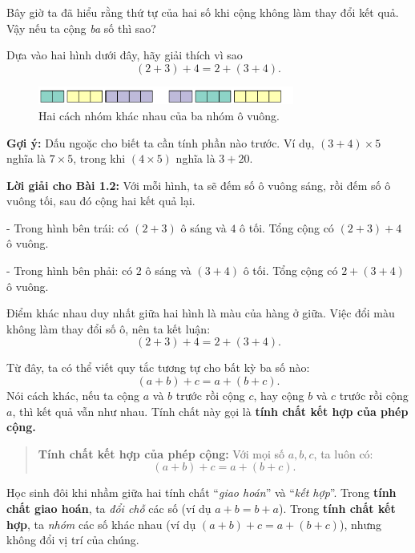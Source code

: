 Bây giờ ta đã hiểu rằng thứ tự của hai số khi cộng không làm thay đổi kết quả.
Vậy nếu ta cộng \emph{ba} số thì sao?

\begin{problem}[1.2]
Dựa vào hai hình dưới đây, hãy giải thích vì sao
\[
(2 + 3) + 4 = 2 + (3 + 4).
\]

\begin{figure}[ht!]
  \centering
  \includegraphics[width=0.75\textwidth]{img/fig-prob1.2-assoc.pdf}
  \caption*{\small Hai cách nhóm khác nhau của ba nhóm ô vuông.}
\end{figure}
\end{problem}

\noindent\textbf{Gợi ý:} Dấu ngoặc cho biết ta cần tính phần nào trước.
Ví dụ, $(3 + 4) \times 5$ nghĩa là $7 \times 5$, trong khi $(4 \times 5)$ nghĩa là $3 + 20$.


\textbf{Lời giải cho Bài 1.2:}  
Với mỗi hình, ta sẽ đếm số ô vuông sáng, rồi đếm số ô vuông tối, sau đó cộng hai kết quả lại.

- Trong hình bên trái: có $(2 + 3)$ ô sáng và $4$ ô tối.  
  Tổng cộng có $(2 + 3) + 4$ ô vuông.

- Trong hình bên phải: có $2$ ô sáng và $(3 + 4)$ ô tối.  
  Tổng cộng có $2 + (3 + 4)$ ô vuông.

Điểm khác nhau duy nhất giữa hai hình là màu của hàng ở giữa.  
Việc đổi màu không làm thay đổi số ô, nên ta kết luận:
\[
(2 + 3) + 4 = 2 + (3 + 4).
\]

Từ đây, ta có thể viết quy tắc tương tự cho bất kỳ ba số nào:
\[
(a + b) + c = a + (b + c).
\]
Nói cách khác, nếu ta cộng $a$ và $b$ trước rồi cộng $c$,  
hay cộng $b$ và $c$ trước rồi cộng $a$, thì kết quả vẫn như nhau.  
Tính chất này gọi là \textbf{tính chất kết hợp của phép cộng.}

\begin{quote}
\textbf{Tính chất kết hợp của phép cộng:}  
Với mọi số $a, b, c$, ta luôn có:
\[
(a + b) + c = a + (b + c).
\]
\end{quote}

\begin{tcolorbox}[colback=yellow!10!white,colframe=orange!80!black,title={Lưu ý quan trọng}]
Học sinh đôi khi nhầm giữa hai tính chất “\emph{giao hoán}” và “\emph{kết hợp}”.  
Trong \textbf{tính chất giao hoán}, ta \emph{đổi chỗ} các số (ví dụ $a+b=b+a$).  
Trong \textbf{tính chất kết hợp}, ta \emph{nhóm} các số khác nhau  
(ví dụ $(a+b)+c=a+(b+c)$), nhưng không đổi vị trí của chúng.
\end{tcolorbox}

